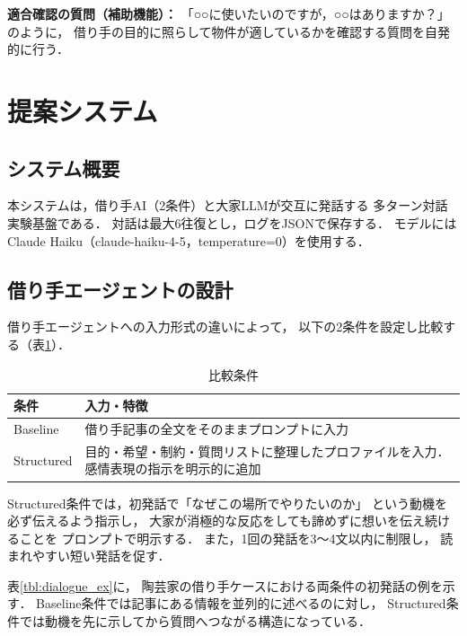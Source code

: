 \documentclass{FITpaper}
\begin{document}
\textbf{適合確認の質問（補助機能）：}
「○○に使いたいのですが，○○はありますか？」のように，
借り手の目的に照らして物件が適しているかを確認する質問を自発的に行う．

\section{提案システム}

\subsection{システム概要}

本システムは，借り手AI（2条件）と大家LLMが交互に発話する
多ターン対話実験基盤である．
対話は最大6往復とし，ログをJSONで保存する．
モデルにはClaude Haiku（claude-haiku-4-5，temperature=0）を使用する．

\subsection{借り手エージェントの設計}

借り手エージェントへの入力形式の違いによって，
以下の2条件を設定し比較する（表\ref{tbl:conditions}）．

\begin{table}[htbp]
  \centering
  \caption{比較条件}
  \label{tbl:conditions}
  \begin{tabular}{l|p{5cm}}
    条件 & 入力・特徴 \\
    \hline
    Baseline & 借り手記事の全文をそのままプロンプトに入力 \\
    Structured & 目的・希望・制約・質問リストに整理したプロファイルを入力．感情表現の指示を明示的に追加 \\
  \end{tabular}
\end{table}

Structured条件では，初発話で「なぜこの場所でやりたいのか」
という動機を必ず伝えるよう指示し，
大家が消極的な反応をしても諦めずに想いを伝え続けることを
プロンプトで明示する．
また，1回の発話を3〜4文以内に制限し，
読まれやすい短い発話を促す．

表\ref{tbl:dialogue_ex}に，
陶芸家の借り手ケースにおける両条件の初発話の例を示す．
Baseline条件では記事にある情報を並列的に述べるのに対し，
Structured条件では動機を先に示してから質問へつながる構造になっている．
\end{document}

